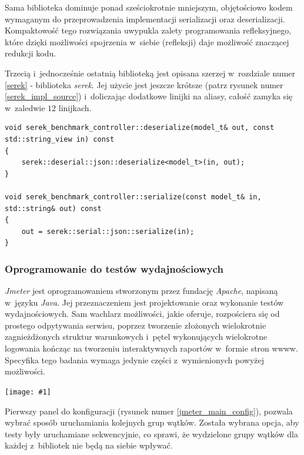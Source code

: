 \documentclass[12pt]{article}
\newcommand{\n}{\newline}
\newcommand{\putss}[3]{
\begin{captioned}[H]
	\centering
	\texttt{[image: \#1]}
	\caption{#2}
	\label{#3}
	\medskip
\end{captioned}
}
\newcommand{\nonpl}[1]{{\it #1}}
\newcommand{\Jmeter}{\nonpl{Jmeter}\texttrademark}
\newcommand{\serek}{\nonpl{serek}}
\begin{document}
{{{				Sama biblioteka dominuje ponad sześciokrotnie mniejszym, objętościowo kodem wymaganym do przeprowadzenia implementacji
				serializacji oraz deserializacji. Kompaktowość tego rozwiązania uwypukla zalety programowania refleksyjnego, które dzięki
				możliwości spojrzenia w~siebie (refleksji) daje możliwość znaczącej redukcji kodu.\n

				Trzecią i~jednocześnie ostatnią biblioteką jest opisana szerzej w~rozdziale numer \ref{serek} - biblioteka \serek.
				Jej użycie jest jeszcze krótsze (patrz rysunek numer \ref{serek_impl_source}) i~doliczając dodatkowe linijki na aliasy,
				całość zamyka się w~zaledwie $12$ linijkach.\n

				\begin{captioned}[H]
					\begin{lstlisting}[frame=single]
void serek_benchmark_controller::deserialize(model_t& out, const std::string_view in) const
{
	serek::deserial::json::deserialize<model_t>(in, out);
}

void serek_benchmark_controller::serialize(const model_t& in, std::string& out) const
{
	out = serek::serial::json::serialize(in);
}
					\end{lstlisting}
					\caption{ Implementacje funkcji do serializacji i deserializacji przy wykorzystaniu biblioteki \serek}
					\label{serek_impl_source}
				\end{captioned}
			}

			{
				\subsubsection{Oprogramowanie do testów wydajnościowych}

				\Jmeter\cite{jmeter} jest oprogramowaniem stworzonym przez fundację \nonpl{Apache}, napisaną w~języku \nonpl{Java}. Jej przeznaczeniem
				jest projektowanie oraz wykonanie testów wydajnościowych. Sam wachlarz możliwości, jakie oferuje, rozpościera się od prostego odpytywania serwisu, poprzez
				tworzenie złożonych wielokrotnie zagnieżdżonych struktur warunkowych i~pętel wykonujących wielokrotne logowania kończąc na tworzeniu interaktywnych
				raportów w~formie stron wwww. Specyfika tego badania wymaga jedynie części z~wymienionych powyżej możliwości.

				\putss{./img/jmeter_ss/main_pane.png}{ Widok ogólnej konfiguracji całego testu}{jmeter_main_config}

				Pierwszy panel do konfiguracji (rysunek numer \ref{jmeter_main_config}), pozwala wybrać sposób uruchamiania kolejnych grup wątków. Została wybrana opcja,
				aby testy były uruchamiane sekwencyjnie, co sprawi, że wydzielone grupy wątków dla każdej z~bibliotek nie będą na siebie wpływać.\n

}}}
\end{document}
